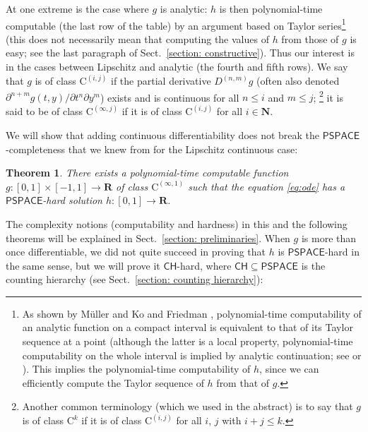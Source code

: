 \documentclass[12pt,a4paper]{article}
\newtheorem{theorem}{Theorem}%
\theoremstyle{definition}
\theoremstyle{remark}
\newcommand{\R}{\mathbf R}
\newcommand{\N}{\mathbf N}
\newcommand{\D}{D}
\newcommand{\classPSPACE}{\mathsf{PSPACE}}
\newcommand{\classCH}{\mathsf{CH}}
\newcommand{\classC}{\mathrm C}
\begin{document}
At one extreme is the case where $g$ is analytic: 
$h$ is then polynomial-time computable 
(the last row of the table) 
by an argument based on Taylor series\footnote{
As shown by M\"uller \cite{muller1987uniform} and 
Ko and Friedman \cite{ko1988computing}, 
polynomial-time computability of an analytic function 
on a compact interval is 
equivalent to that of its Taylor sequence at a point 
(although the latter is a local property, 
polynomial-time computability on the whole interval is implied 
by analytic continuation; 
see \cite[Corollary~4.5]{muller1987uniform}
or \cite[Theorem~11]{kawamura2010complexity}). 
This implies the polynomial-time computability of $h$, 
since we can efficiently compute the 
Taylor sequence of $h$ from that of $g$. 
} (this does not necessarily mean that 
computing the values of $h$ from those of $g$ is easy; 
see the last paragraph of Sect.~\ref{section: constructive}). 
Thus our interest is in 
the cases between Lipschitz and analytic 
(the fourth and fifth rows). 
We say that $g$ is of class $\classC ^{(i, j)}$
if the partial derivative $\D ^{(n, m)} g$ 
(often also denoted $\partial ^{n + m} g (t, y) / \partial t ^n \partial y ^m$)
exists and is continuous for all $n \le i$ and $m \le j$;%
\footnote{%
Another common terminology (which we used in the abstract)
is to say that $g$ is of class $\classC ^k$
if it is of class $\classC ^{(i,j)}$ 
for all $i$, $j$ with $i + j \leq k$.}
it is said to be of class $\classC ^{(\infty, j)}$ if
it is of class $\classC ^{(i, j)}$ for all $i \in \N$. 

We will show that adding continuous differentiability does not break the
$\classPSPACE$-completeness that we knew from \cite{kawamura2010lipschitz} 
for the Lipschitz continuous case: 

\begin{theorem}
 \label{DifferentiableIsPspace}
There exists a polynomial-time computable function
$g \colon [0,1] \times [-1,1] \to \R$ 
of class $\classC ^{(\infty, 1)}$ such that
the equation \eqref{eq:ode} has a 
$\classPSPACE$-hard solution $h \colon [0, 1] \to \R$. 
 \end{theorem}

The complexity notions (computability and hardness) in this and the following theorems 
will be explained in Sect.~\ref{section: preliminaries}. 
When $g$ is more than once differentiable, 
we did not quite succeed in proving that $h$ is $\classPSPACE$-hard
in the same sense, 
but we will prove it $\classCH$-hard, 
where $\classCH \subseteq \classPSPACE$ is the 
counting hierarchy (see Sect.~\ref{section: counting hierarchy}): 
\end{document}
